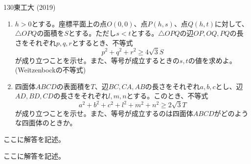 \begin{thm}{130}{}{東工大 (2019)}
 \begin{enumerate}
  \item $h>0$とする。座標平面上の点$O(0,0)$、点$P(h,s)$、点$Q(h,t)$に対して、$\triangle{OPQ}$の面積を$S$とする。ただし$s<t$とする。$\triangle{OPQ}$の辺$OP, OQ, PQ$の長さをそれぞれ$p, q, r$とするとき、不等式
	\[ p^2+q^2+r^2\ge 4\sqrt{3}S \]
	が成り立つことを示せ。また、等号が成立するときの$s, t$の値を求めよ。 (Weitzenbockの不等式)
  \item 四面体$ABCD$の表面積を$T$、辺$BC, CA, AB$の長さをそれぞれ$a, b, c$とし、辺$AD, BD, CD$の長さをそれぞれ$l, m, n$とする。このとき、不等式
	\[a^2+b^2+c^2+l^2+m^2+n^2 \ge 2\sqrt{3}T \]
	が成り立つことを示せ。また、等号が成立するのは四面体$ABCD$がどのような四面体のときか。
 \end{enumerate}
\end{thm}

ここに解答を記述。

ここに解答を記述。
